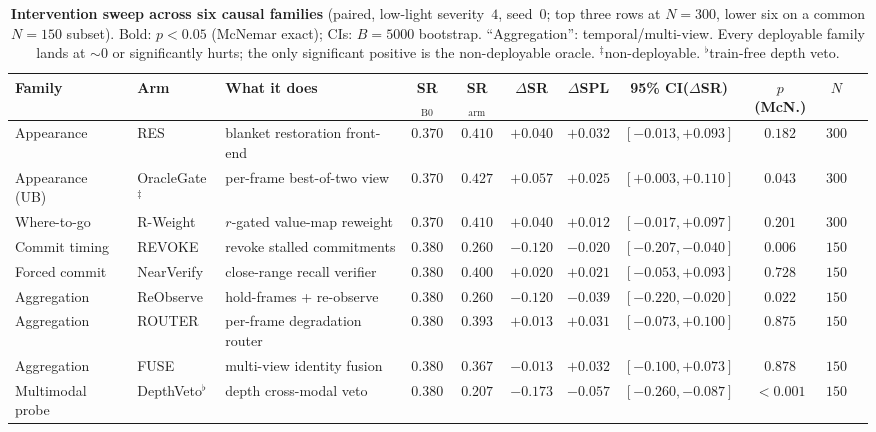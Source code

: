 \begin{table}[t]
\centering
\footnotesize
\setlength{\tabcolsep}{3.0pt}
\begin{tabular}{@{}lllcccccccc@{}}
\toprule
Family & Arm & What it does & SR$_{\text{B0}}$ & SR$_{\text{arm}}$ & $\Delta$SR & $\Delta$SPL & 95\% CI($\Delta$SR) & $p$ (McN.) & $N$ \\
\midrule
Appearance & RES & blanket restoration front-end & $0.370$ & $0.410$ & $+0.040$ & $+0.032$ & $[-0.013,+0.093]$ & $0.182$ & $300$ \\
Appearance (UB) & OracleGate$^{\ddagger}$ & per-frame best-of-two view & $0.370$ & $0.427$ & $\mathbf{+0.057}$ & $+0.025$ & $[+0.003,+0.110]$ & $\mathbf{0.043}$ & $300$ \\
Where-to-go & R-Weight & $r$-gated value-map reweight & $0.370$ & $0.410$ & $+0.040$ & $+0.012$ & $[-0.017,+0.097]$ & $0.201$ & $300$ \\
Commit timing & REVOKE & revoke stalled commitments & $0.380$ & $0.260$ & $\mathbf{-0.120}$ & $-0.020$ & $[-0.207,-0.040]$ & $\mathbf{0.006}$ & $150$ \\
Forced commit & NearVerify & close-range recall verifier & $0.380$ & $0.400$ & $+0.020$ & $+0.021$ & $[-0.053,+0.093]$ & $0.728$ & $150$ \\
Aggregation & ReObserve & hold-frames + re-observe & $0.380$ & $0.260$ & $\mathbf{-0.120}$ & $-0.039$ & $[-0.220,-0.020]$ & $\mathbf{0.022}$ & $150$ \\
Aggregation & ROUTER & per-frame degradation router & $0.380$ & $0.393$ & $+0.013$ & $+0.031$ & $[-0.073,+0.100]$ & $0.875$ & $150$ \\
Aggregation & FUSE & multi-view identity fusion & $0.380$ & $0.367$ & $-0.013$ & $+0.032$ & $[-0.100,+0.073]$ & $0.878$ & $150$ \\
Multimodal probe & DepthVeto$^{\flat}$ & depth cross-modal veto & $0.380$ & $0.207$ & $\mathbf{-0.173}$ & $-0.057$ & $[-0.260,-0.087]$ & $\mathbf{{<}0.001}$ & $150$ \\
\bottomrule
\end{tabular}
\caption{\textbf{Intervention sweep across six causal families} (paired, low-light severity~$4$, seed~$0$; top three rows at $N{=}300$, lower six on a common $N{=}150$ subset). Bold: $p{<}0.05$ (McNemar exact); CIs: $B{=}5000$ bootstrap. ``Aggregation'': temporal/multi-view. Every deployable family lands at ${\sim}0$ or significantly hurts; the only significant positive is the non-deployable oracle. $^{\ddagger}$non-deployable. $^{\flat}$train-free depth veto.}
\label{tab:sweep}
\end{table}
